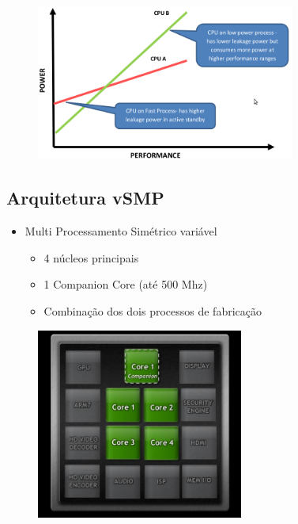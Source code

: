 \documentclass{beamer}
\begin{document}
\begin{frame}
  \begin{figure}[ht]
    \centering
    \includegraphics[width=8.5cm]{./pictures/Tecnologiasdeprocesso.png}
  \end{figure}
\end{frame}
   
\subsection{Arquitetura vSMP}
\begin{frame}
  \begin{itemize}
  \item Multi Processamento Sim\'etrico vari\'avel
    \begin{itemize}
      \item 4 n\'ucleos principais
      \item 1 Companion Core (at\'e 500 Mhz)
      \item Combina\c{c}\~ao dos dois processos de fabrica\c{c}\~ao
    \end{itemize}
  \end{itemize}
  \begin{figure}
    \centering
    \includegraphics[width=6.8cm]{./pictures/CompanionCore}
  \end{figure}
\end{frame}
\end{document}
